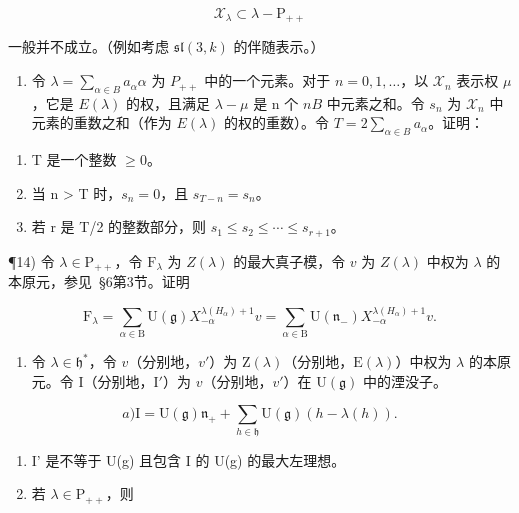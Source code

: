 \[
\mathcal {X} _ {\lambda} \subset \lambda - \mathrm{P} _ {+ +}
\]

一般并不成立。（例如考虑 \(\mathfrak{sl}(3,k)\) 的伴随表示。）

\begin{enumerate}
\def\labelenumi{\arabic{enumi})}
\setcounter{enumi}{12}
\tightlist
\item
  令 \(\lambda = \sum_{\alpha \in B} a_{\alpha} \alpha\) 为 \(P_{++}\) 中的一个元素。对于 \(n = 0, 1, \ldots\)，以 \(\mathcal{X}_n\) 表示权 \(\mu\)，它是 \(E(\lambda)\) 的权，且满足 \(\lambda - \mu\) 是 n 个 \(n\)\(B\) 中元素之和。令 \(s_n\) 为 \(\mathcal{X}_n\) 中元素的重数之和（作为 \(E(\lambda)\) 的权的重数）。令 \(T = 2 \sum_{\alpha \in B} a_{\alpha}\)。证明：
\end{enumerate}

\begin{enumerate}
\def\labelenumi{\alph{enumi})}
\item
  T 是一个整数 \(\geq 0\)。
\item
  当 n > T 时，\(s_{n}=0\)，且 \(s_{T-n}=s_{n}\)。
\item
  若 r 是 T/2 的整数部分，则 \(s_{1} \leq s_{2} \leq \cdots \leq s_{r+1}\)。
\end{enumerate}

¶14) 令 \(\lambda \in \mathrm{P}_{++}\)，令 \(\mathrm{F}_{\lambda}\) 为 \(Z(\lambda)\) 的最大真子模，令 \(v\) 为 \(Z(\lambda)\) 中权为 \(\lambda\) 的本原元，参见~§6第3节。证明

\[
\mathrm{F} _ {\lambda} = \sum_ {\alpha \in \mathrm{B}} \mathrm{U} (\mathfrak {g}) X _ {- \alpha} ^ {\lambda (H _ {\alpha}) + 1} v = \sum_ {\alpha \in \mathrm{B}} \mathrm{U} (\mathfrak {n} _ {-}) X _ {- \alpha} ^ {\lambda (H _ {\alpha}) + 1} v.
\]

\begin{enumerate}
\def\labelenumi{\arabic{enumi})}
\setcounter{enumi}{14}
\tightlist
\item
  令 \(\lambda \in \mathfrak{h}^*\)，令 \(v\)（分别地，\(v'\)）为 \(\mathrm{Z}(\lambda)\)（分别地，\(\mathrm{E}(\lambda)\)）中权为 \(\lambda\) 的本原元。令 \(\mathrm{I}\)（分别地，\(\mathrm{I}'\)）为 \(v\)（分别地，\(v'\)）在 \(\mathrm{U}(\mathfrak{g})\) 中的湮没子。
\end{enumerate}

\[
a) \mathrm{I} = \mathrm{U} (\mathfrak {g}) \mathfrak {n} _ {+} + \sum_ {h \in \mathfrak {h}} \mathrm{U} (\mathfrak {g}) (h - \lambda (h)).
\]

\begin{enumerate}
\def\labelenumi{\alph{enumi})}
\setcounter{enumi}{1}
\item
I' 是不等于 U(g) 且包含 I 的 U(g) 的最大左理想。
\item
  若 \(\lambda \in \mathrm{P}_{++}\)，则
\end{enumerate}

